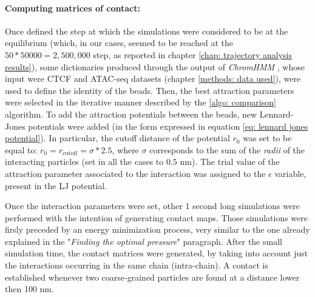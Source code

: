 
\paragraph{Computing matrices of contact:}

Once defined the step at which the simulations were considered to be at the equilibrium (which, in our cases, seemed to be reached at the $50 * 50000 = 2,500,000$ step, as reported in chapter \ref{chap: trajectory analysis results}), some dictionaries produced through the output of \textit{ChromHMM} 
\cite{chilledhousevibesLearningChromatinStates2015,ernstChromatinstateDiscoveryGenome2017}
, whose input were CTCF and ATAC-seq datasets (chapter \ref{methods: data used}), were used to define the identity of the beads. Then, the best attraction parameters were selected in the iterative manner described by the \ref{algo: comparison} algorithm. To add the attraction potentials between the beads, new Lennard-Jones potentials were added (in the form expressed in equation \ref{eq: lennard jones potential}). In particular, the cutoff distance of the potential $r_0$ was set to be equal to: $r_0 = r_{\text{cutoff}} = \sigma * 2.5$, where $\sigma$ corresponds to the sum of the \textit{radii} of the interacting particles (set in all the cases to $0.5$ nm). The trial value of the attraction parameter associated to the interaction was assigned to the $\epsilon$ variable, present in the LJ potential.



Once the interaction parameters were set, other 1 second long simulations were performed with the intention of generating contact maps. Those simulations were firsly preceded by an energy minimization process, very similar to the one already explained in the "\textit{Finding the optimal pressure}" paragraph. After the small simulation time, the contact matrices were generated, by taking into account just the interactions occurring in the same chain (intra-chain). A contact is established whenever two coarse-grained particles are found at a distance lower then 100 nm.


